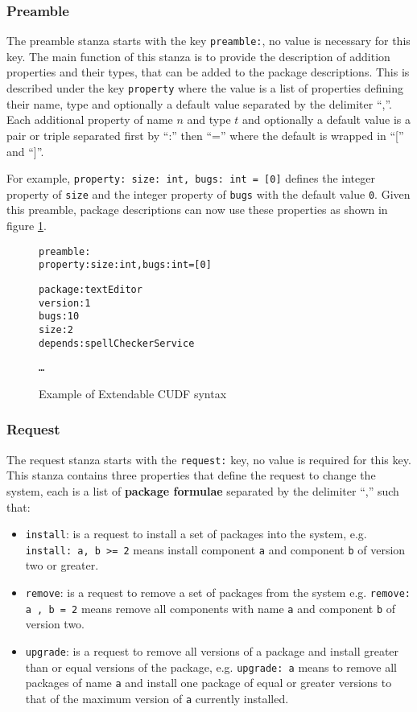 \subsubsection{Preamble}
The preamble stanza starts with the key \verb+preamble:+, no value is necessary for this key.
The main function of this stanza is to provide the description of addition properties and their types, that can be added to the package descriptions.
This is described under the key \verb+property+ where the value is a list of properties defining their name, type and optionally a default value separated by the delimiter ``,''.
Each additional property of name $n$ and type $t$ and optionally a default value is a pair or triple separated first by ``:'' then ``='' where the default is wrapped in ``['' and ``]''.

For example, \verb+property: size: int, bugs: int = [0]+ defines the integer property of \verb+size+ and the integer property of \verb+bugs+ with the default value \verb+0+.
Given this preamble, package descriptions can now use these properties as shown in figure \ref{formal.cudfextensionexample}.

\begin{figure}[htp] 
\begin{center}
\begin{alltt}
preamble:
property: size: int, bugs: int = [0]

package: textEditor
version: 1
bugs: 10
size: 2
depends: spellCheckerService

\ldots

\end{alltt}
  \caption[Example of Extendable CUDF syntax]{Example of Extendable CUDF syntax}
  \label{formal.cudfextensionexample}
\end{center}
\end{figure}

\subsubsection{Request}
\label{formal.cudfdes.request}
The request stanza starts with the \verb+request:+ key, no value is required for this key.
This stanza contains three properties that define the request to change the system,
each is a list of \textbf{package formulae} separated by the delimiter ``,'' such that:
\begin{itemize}
  \item \verb+install+: is a request to install a set of packages into the system,
  e.g. \verb+install: a, b >= 2+ means install component \verb+a+ and component \verb+b+ of version two or greater.
  \item \verb+remove+: is a request to remove a set of packages from the system 
  e.g. \verb+remove: a , b = 2+ means remove all components with name \verb+a+ and component \verb+b+ of version two.
  \item \verb+upgrade+: is a request to remove all versions of a package and install greater than or equal versions of the package,
  e.g. \verb+upgrade: a+ means to remove all packages of name \verb+a+ and install one package of equal or greater versions to that of the maximum version of \verb+a+ currently installed. 
\end{itemize}

